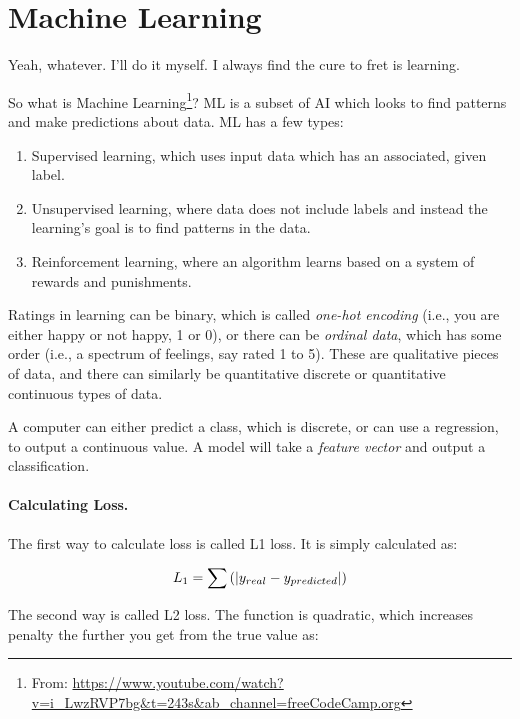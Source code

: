 \chapter{Machine Learning}

Yeah, whatever. I'll do it myself. I always find the cure to fret is learning.\newline

So what is Machine Learning\footnote{From: \url{https://www.youtube.com/watch?v=i_LwzRVP7bg&t=243s&ab_channel=freeCodeCamp.org}}? ML is a subset of AI which looks to find patterns and make predictions about data. ML has a few types: 

\begin{enumerate}
    \item Supervised learning, which uses input data which has an associated, given label. 
    \item Unsupervised learning, where data does not include labels and instead the learning's goal is to find patterns in the data. 
    \item Reinforcement learning, where an algorithm learns based on a system of rewards and punishments. 
\end{enumerate}

Ratings in learning can be binary, which is called \textit{one-hot encoding} (i.e., you are either happy or not happy, 1 or 0), or there can be \textit{ordinal data}, which has some order (i.e., a spectrum of feelings, say rated 1 to 5). These are qualitative pieces of data, and there can similarly be quantitative discrete or quantitative continuous types of data.\newline

A computer can either predict a class, which is discrete, or can use a regression, to output a continuous value. A model will take a \textit{feature vector} and output a classification. 


\subsubsection{Calculating Loss.}
The first way to calculate loss is called L1 loss. It is simply calculated as: 

\begin{equation}
\begin{split}
    L_1 = \sum \left(| y_{real} - y_{predicted}|\right)
\end{split}
\end{equation}

The second way is called L2 loss. The function is quadratic, which increases penalty the further you get from the true value as: 


